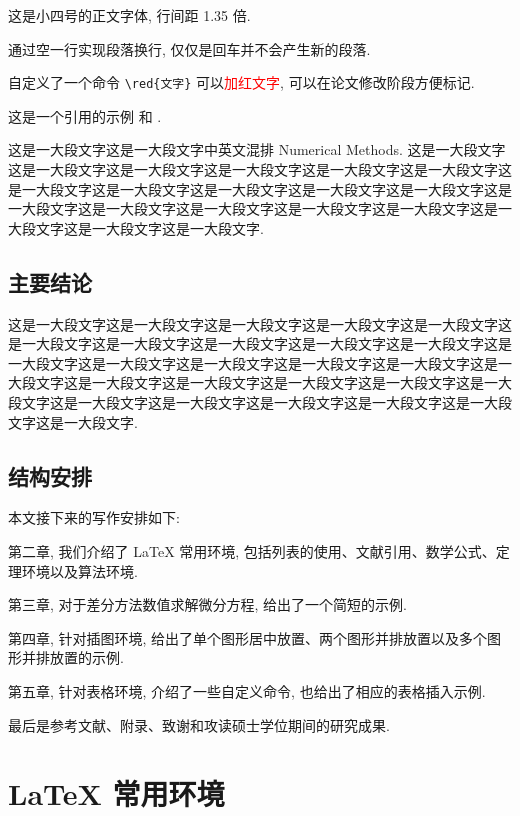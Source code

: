 \documentclass[master]{shnuthesis}
\newcommand{\red}[1]{\textcolor{red}{#1}}
\begin{document}
这是小四号的正文字体, 行间距 1.35 倍.

通过空一行实现段落换行, 仅仅是回车并不会产生新的段落.

自定义了一个命令 \verb|\red{文字}| 可以\red{加红文字}, 可以在论文修改阶段方便标记.

这是一个引用的示例 \cite{Tadmor2012} 和 \cite{LiLiu1997,Adams2003,TreWei2014}.

这是一大段文字这是一大段文字中英文混排 Numerical Methods. 这是一大段文字这是一大段文字这是一大段文字这是一大段文字这是一大段文字这是一大段文字这是一大段文字这是一大段文字这是一大段文字这是一大段文字这是一大段文字这是一大段文字这是一大段文字这是一大段文字这是一大段文字这是一大段文字这是一大段文字这是一大段文字这是一大段文字.


\section{主要结论}

这是一大段文字这是一大段文字这是一大段文字这是一大段文字这是一大段文字这是一大段文字这是一大段文字这是一大段文字这是一大段文字这是一大段文字这是一大段文字这是一大段文字这是一大段文字这是一大段文字这是一大段文字这是一大段文字这是一大段文字这是一大段文字这是一大段文字这是一大段文字这是一大段文字这是一大段文字这是一大段文字这是一大段文字这是一大段文字这是一大段文字这是一大段文字.


\section{结构安排}

本文接下来的写作安排如下:

第二章, 我们介绍了 LaTeX 常用环境, 包括列表的使用、文献引用、数学公式、定理环境以及算法环境.

第三章, 对于差分方法数值求解微分方程, 给出了一个简短的示例.

第四章, 针对插图环境, 给出了单个图形居中放置、两个图形并排放置以及多个图形并排放置的示例.

第五章, 针对表格环境, 介绍了一些自定义命令, 也给出了相应的表格插入示例.

最后是参考文献、附录、致谢和攻读硕士学位期间的研究成果.




\chapter{LaTeX 常用环境}
\end{document}
